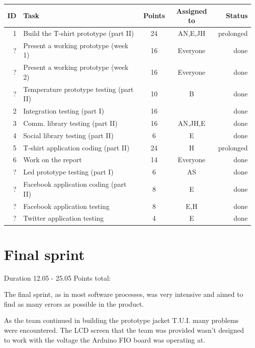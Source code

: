 \begin{table}[ht!]
\begin{tabular}{ | r | l | c | c | r | }

\hline
\textbf{ID} & \textbf{Task} & \textbf{Points} & \textbf{Assigned to} & \textbf{Status} \\
\hline

 1 & Build the T-shirt prototype (part II)	& 24 & AN,E,JH		& prolonged \\
\hline
 ? & Present a working prototype (week 1)		& 16 & Everyone		& done \\
\hline
 ? & Present a working prototype (week 2)		& 16 & Everyone		& done \\
\hline
 ? & Temperature prototype testing (part II)	& 10 & B			& done \\
\hline
 2 & Integration testing (part I)				& 16 &  			& done \\
\hline
 3 & Comm. library testing (part II)			& 16 & AN,JH,E		& done \\
\hline
 4 & Social library testing (part II)			& 6  & E			& done \\
\hline
 5 & T-shirt application coding (part II)		& 24 & H			& prolonged \\
\hline
 6 & Work on the report							& 14 & Everyone		& done \\
\hline
 ? & Led prototype testing (part I)				& 6  & AS			& done \\
\hline
 ? & Facebook application coding (part II)		& 8  & E			& done \\
\hline
 ? & Facebook application testing				& 8  & E,H			& done \\
\hline
 ? & Twitter application testing				& 4	 & E			& done \\
\hline

\end{tabular}
\end{table}

\newpage

\section{Final sprint}

Duration 12.05 - 25.05
Points total:

The final sprint, as in most software processes, was very intensive and aimed
to find as many errors as possible in the product.

As the team continued in building the prototype jacket T.U.I. many problems were
encountered. The LCD screen that the team was provided wasn't designed to work
with the voltage the Arduino FIO board was operating at.


